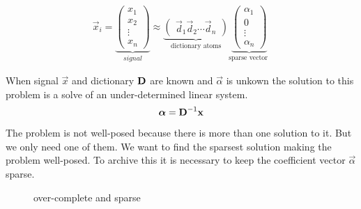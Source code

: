 \begin{align}
\vec{x}_i = \underbrace{\begin{pmatrix} x_1 \\ x_2 \\ \vdots \\ x_n
\end{pmatrix}}_{signal}
\approx \underbrace{\begin{pmatrix} \vec{d}_1  \vec{d}_2 \cdots \vec{d}_n
\end{pmatrix}}_{\textrm{dictionary atoms}}
\underbrace{\begin{pmatrix} \alpha_1 \\ 0 \\ \vdots \\ \alpha_n
\end{pmatrix}}_{\textrm{sparse vector }}
\end{align}

When signal $\vec{x}$ and dictionary $\boldsymbol{\mathrm{D}}$ are known 
and $\vec{\alpha}$ is unkown the solution to this problem is a solve of an
under-determined linear system.
\begin{equation}
 \boldsymbol{\mathrm{\alpha}} = \boldsymbol{\mathrm{D}}^{-1}\boldsymbol{\mathrm{x}} 
\end{equation}
The problem is not well-posed because there is more than one
solution to it. %
But we only need one of them. We want to find the sparsest
solution making the problem well-posed. To archive this it is necessary to keep
the coefficient vector $\vec{\alpha}$ sparse. 

\begin{figure}[h]
\centering
{}
\hspace{5mm}
\caption{over-complete and sparse}
\label{fig:sparse}
\end{figure}






